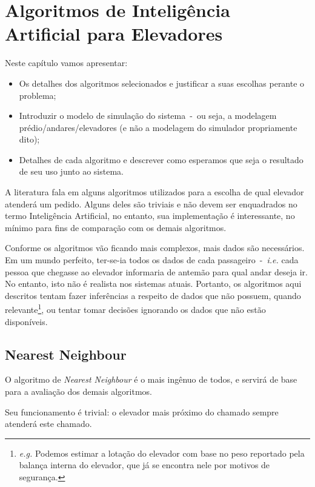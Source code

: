 \chapter{\label{chap:ai}Algoritmos de Inteligência Artificial para Elevadores}

Neste capítulo vamos apresentar:

\begin{itemize}
\item Os detalhes dos algoritmos selecionados e justificar a suas escolhas perante o problema;
\item Introduzir o modelo de simulação do sistema~-~ou seja, a modelagem
prédio/andares/elevadores (e não a modelagem do simulador propriamente dito);
\item Detalhes de cada algoritmo e descrever como esperamos que seja o resultado de seu uso junto ao sistema.
\end{itemize}

A literatura fala em alguns algoritmos utilizados para a escolha de qual
elevador atenderá um pedido. Alguns deles são triviais e não devem ser
enquadrados no termo Inteligência Artificial, no entanto, sua implementação é
interessante, no mínimo para fins de comparação com os demais algoritmos.

Conforme os algoritmos vão ficando mais complexos, mais dados são necessários.
Em um mundo perfeito, ter-se-ia todos os dados de cada passageiro~-~\textit{i.e.} cada
pessoa que chegasse ao elevador informaria de antemão para qual andar deseja ir.
No entanto, isto não é realista nos sistemas atuais. Portanto, os algoritmos
aqui descritos tentam fazer inferências a respeito de dados que não possuem,
quando relevante\footnote{\textit{e.g.} Podemos estimar a lotação do elevador
  com base no peso reportado pela balança interna do elevador, que já se
  encontra nele por motivos de segurança.}, ou tentar tomar decisões ignorando
os dados que não estão disponíveis.

\section{\label{sec:ai:nn}Nearest Neighbour}

O algoritmo de \textit{Nearest Neighbour} é o mais ingênuo de todos, e servirá
de base para a avaliação dos demais algoritmos.

Seu funcionamento é trivial: o elevador mais próximo do chamado sempre
atenderá este chamado.

